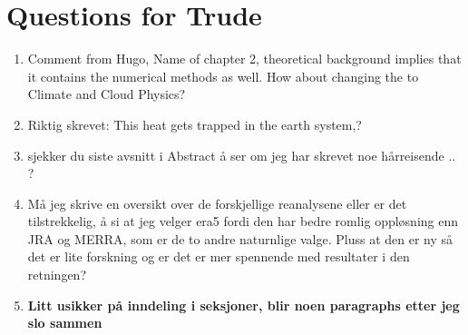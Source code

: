 \section{Questions for Trude}
\begin{enumerate}
    \item Comment from Hugo, Name of chapter 2, theoretical background implies that it contains the numerical methods as well. How about changing the to Climate and Cloud Physics?
    \item Riktig skrevet: This heat gets trapped in the earth system,?
    \item sjekker du siste avsnitt i Abstract å ser om jeg har skrevet noe hårreisende .. ?
    \item Må jeg skrive en oversikt over de forskjellige reanalysene eller er det tilstrekkelig, å si at jeg velger \acrshort{era5} fordi den har bedre romlig oppløsning enn JRA og MERRA, som er de to andre naturnlige valge. Pluss at den er ny så det er lite forskning og er det er mer spennende med resultater i den retningen?
    \item \textbf{Litt usikker på inndeling i seksjoner, blir noen paragraphs etter jeg slo sammen }
\end{enumerate}
